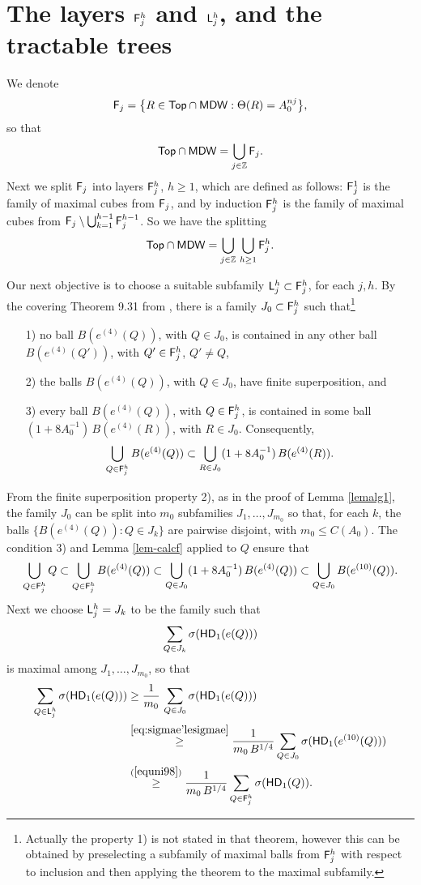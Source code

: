 
\section{The layers \texorpdfstring{${\mathsf{F}}_j^h$ and ${\mathsf{L}}_j^h$}{Fjh and Ljh}, and the tractable trees}\label{sec-layers}

We denote
$${\mathsf{F}}_j= \big\{R\in {\mathsf {Top}}\cap {\mathsf{MDW}}:\Theta(R)=A_0^{nj}\big\},$$
so that 
$${\mathsf {Top}}\cap {\mathsf{MDW}}= \bigcup_{j\in{\mathbb Z}} {\mathsf{F}}_j.$$
Next we split ${\mathsf{F}}_j$ into layers ${\mathsf{F}}_j^h$, $h\geq1$, which are defined as follows:
${\mathsf{F}}_j^1$ is the family of maximal cubes from ${\mathsf{F}}_j$, and by induction
${\mathsf{F}}_j^h$ is the family of maximal cubes from ${\mathsf{F}}_j\setminus \bigcup_{k=1}^{h-1} {\mathsf{F}}_j^{h-1}$.
So we have the splitting
$${\mathsf {Top}}\cap {\mathsf{MDW}}= \bigcup_{j\in{\mathbb Z}}\,\bigcup_{h\geq1} {\mathsf{F}}_j^h.$$


Our next objective is to choose a suitable subfamily ${\mathsf{L}}_j^h\subset {\mathsf{F}}_j^h$, for each $j,h$.
By the covering Theorem 9.31 from \cite{Tolsa-llibre}, there
is a family $J_0\subset {\mathsf{F}}_j^h$ such that\footnote{Actually the property 1) is not stated in that theorem, however this can be obtained by preselecting a subfamily of maximal balls from ${\mathsf{F}}_j^h$
with respect to inclusion and then applying the theorem to the maximal subfamily.}
\begin{itemize}
\item[1)] no ball $B(e^{(4)}(Q))$, with $Q\in J_0$, is contained in any other ball  
$B(e^{(4)}(Q'))$, with $Q'\in {\mathsf{F}}_j^h$, $Q'\neq Q$,
\item[2)] the balls $B(e^{(4)}(Q))$, with $Q\in J_0$, have finite superposition, 
and
\item[3)] 
every ball $B(e^{(4)}(Q))$, with $Q\in{\mathsf{F}}_j^h$, is contained in some ball 
$(1+8A_0^{-1})\,B(e^{(4)}(R))$, with $R\in J_0$. Consequently,
$$\bigcup_{Q\in{\mathsf{F}}_j^h} B(e^{(4)}(Q)) \subset \bigcup_{R\in J_0} (1+8A_0^{-1})\,B(e^{(4)}(R)).$$
\end{itemize}


From the finite superposition property 2), as in the proof of Lemma \ref{lemalg1}, the family 
$J_0$ can be split into $m_0$ subfamilies $J_1,\ldots, J_{m_0}$ so that, for each $k$,  the balls $\{B(e^{(4)}(Q)): Q\in J_k\}$  are pairwise disjoint, with $m_0\leq C(A_0)$.
The condition 3) and Lemma \ref{lem-calcf} applied to $Q$ ensure that
\begin{equation}\label{equni98}
\bigcup_{Q\in{\mathsf{F}}_j^h} Q\subset \bigcup_{Q\in{\mathsf{F}}_j^h} B(e^{(4)}(Q) )\subset \bigcup_{Q\in J_0} (1+8A_0^{-1})\,B(e^{(4)}(Q)) \subset \bigcup_{Q\in J_0} B(e^{(10)}(Q)).
\end{equation}
Next we choose ${\mathsf{L}}_j^h=J_k$ to be the family such that
$$\sum_{Q\in J_k}\sigma({\mathsf{HD}}_1(e(Q)))$$
is maximal among $J_1,\ldots,J_{m_0}$, so that
\begin{align*}
\sum_{Q\in \sL_j^h}\sigma(\HD_1(e(Q))) & \geq \frac1{m_0}\,
\sum_{Q\in J_0}\sigma(\HD_1(e(Q)))\\
& \overset{\eqref{eq:sigmae'lesigmae}}{\geq} \frac{1}{m_0\,B^{1/4}} \sum_{Q\in J_0}\sigma(\HD_1(e^{(10)}(Q)))\\
& \overset{\rf{equni98}}{\geq} \frac{1}{m_0\,B^{1/4}} \sum_{Q\in \sF_j^h} \sigma(\HD_1(Q)).
\end{align*}

